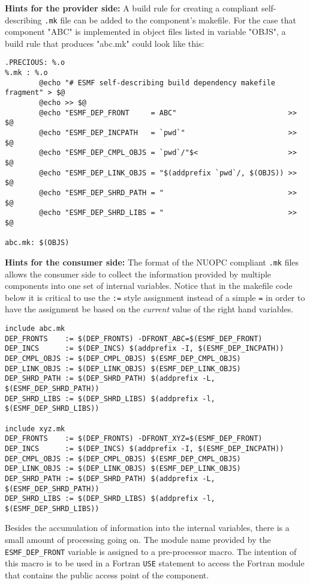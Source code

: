 {\bf Hints for the provider side:} A build rule for creating a compliant self-describing {\tt .mk} file can be added to the component's makefile. For the case that component "ABC" is implemented in object files listed in variable "OBJS", a build rule that produces "abc.mk" could look like this:

\begin{verbatim}
.PRECIOUS: %.o
%.mk : %.o
        @echo "# ESMF self-describing build dependency makefile fragment" > $@
        @echo >> $@
        @echo "ESMF_DEP_FRONT     = ABC"                          >> $@
        @echo "ESMF_DEP_INCPATH   = `pwd`"                        >> $@
        @echo "ESMF_DEP_CMPL_OBJS = `pwd`/"$<                     >> $@
        @echo "ESMF_DEP_LINK_OBJS = "$(addprefix `pwd`/, $(OBJS)) >> $@
        @echo "ESMF_DEP_SHRD_PATH = "                             >> $@
        @echo "ESMF_DEP_SHRD_LIBS = "                             >> $@

abc.mk: $(OBJS)
\end{verbatim}

{\bf Hints for the consumer side:} The format of the NUOPC compliant {\tt .mk} files allows the consumer side to collect the information provided by multiple components into one set of internal variables. Notice that in the makefile code below it is critical to use the {\tt :=} style assignment instead of a simple {\tt =} in order to have the assignment be based on the {\em current} value of the right hand variables.

\begin{verbatim}
include abc.mk
DEP_FRONTS    := $(DEP_FRONTS) -DFRONT_ABC=$(ESMF_DEP_FRONT)
DEP_INCS      := $(DEP_INCS) $(addprefix -I, $(ESMF_DEP_INCPATH))
DEP_CMPL_OBJS := $(DEP_CMPL_OBJS) $(ESMF_DEP_CMPL_OBJS)
DEP_LINK_OBJS := $(DEP_LINK_OBJS) $(ESMF_DEP_LINK_OBJS)
DEP_SHRD_PATH := $(DEP_SHRD_PATH) $(addprefix -L, $(ESMF_DEP_SHRD_PATH))
DEP_SHRD_LIBS := $(DEP_SHRD_LIBS) $(addprefix -l, $(ESMF_DEP_SHRD_LIBS))

include xyz.mk
DEP_FRONTS    := $(DEP_FRONTS) -DFRONT_XYZ=$(ESMF_DEP_FRONT)
DEP_INCS      := $(DEP_INCS) $(addprefix -I, $(ESMF_DEP_INCPATH))
DEP_CMPL_OBJS := $(DEP_CMPL_OBJS) $(ESMF_DEP_CMPL_OBJS)
DEP_LINK_OBJS := $(DEP_LINK_OBJS) $(ESMF_DEP_LINK_OBJS)
DEP_SHRD_PATH := $(DEP_SHRD_PATH) $(addprefix -L, $(ESMF_DEP_SHRD_PATH))
DEP_SHRD_LIBS := $(DEP_SHRD_LIBS) $(addprefix -l, $(ESMF_DEP_SHRD_LIBS))
\end{verbatim}

Besides the accumulation of information into the internal variables, there is a small amount of processing going on. The module name provided by the {\tt ESMF\_DEP\_FRONT} variable is assigned to a pre-processor macro. The intention of this macro is to be used in a Fortran {\tt USE} statement to access the Fortran module that contains the public access point of the component.

